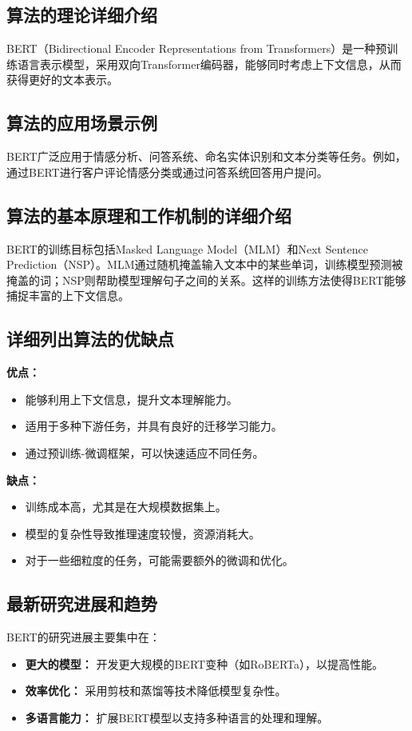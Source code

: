 \subsection*{算法的理论详细介绍}
BERT（Bidirectional Encoder Representations from Transformers）是一种预训练语言表示模型，采用双向Transformer编码器，能够同时考虑上下文信息，从而获得更好的文本表示。

\subsection*{算法的应用场景示例}
BERT广泛应用于情感分析、问答系统、命名实体识别和文本分类等任务。例如，通过BERT进行客户评论情感分类或通过问答系统回答用户提问。

\subsection*{算法的基本原理和工作机制的详细介绍}
BERT的训练目标包括Masked Language Model（MLM）和Next Sentence Prediction（NSP）。MLM通过随机掩盖输入文本中的某些单词，训练模型预测被掩盖的词；NSP则帮助模型理解句子之间的关系。这样的训练方法使得BERT能够捕捉丰富的上下文信息。

\subsection*{详细列出算法的优缺点}
\textbf{优点：}
\begin{itemize}
    \item 能够利用上下文信息，提升文本理解能力。
    \item 适用于多种下游任务，并具有良好的迁移学习能力。
    \item 通过预训练-微调框架，可以快速适应不同任务。
\end{itemize}

\textbf{缺点：}
\begin{itemize}
    \item 训练成本高，尤其是在大规模数据集上。
    \item 模型的复杂性导致推理速度较慢，资源消耗大。
    \item 对于一些细粒度的任务，可能需要额外的微调和优化。
\end{itemize}

\subsection*{最新研究进展和趋势}
BERT的研究进展主要集中在：
\begin{itemize}
    \item \textbf{更大的模型：} 开发更大规模的BERT变种（如RoBERTa），以提高性能。
    \item \textbf{效率优化：} 采用剪枝和蒸馏等技术降低模型复杂性。
    \item \textbf{多语言能力：} 扩展BERT模型以支持多种语言的处理和理解。
\end{itemize}

